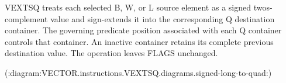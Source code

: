 VEXTSQ treats each selected B, W, or L source element as a signed two\textquotesingle{}s-complement
value and sign-extends it into the corresponding Q destination container.  The
governing predicate position associated with each Q container controls that
container.  An inactive container retains its complete previous destination
value.  The operation leaves FLAGS unchanged.

(:diagram:VECTOR.instructions.VEXTSQ.diagrams.signed-long-to-quad:)

